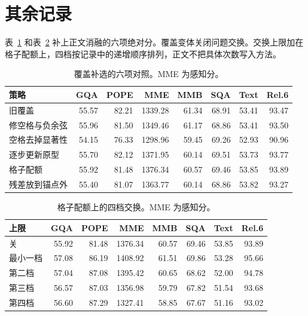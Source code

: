 \appendix
\section{其余记录}
\label{sec:appendix}

表~\ref{tab:coverfull} 和表~\ref{tab:swapfull} 补上正文消融的六项绝对分。覆盖变体关闭问题交换。交换上限加在格子配额上，四档按记录中的递增顺序排列，正文不把具体次数写入方法。

\begin{table}[h]
\centering
\scriptsize
\setlength{\tabcolsep}{2.6pt}
\caption{覆盖补选的六项对照。MME 为感知分。}
\label{tab:coverfull}
\begin{tabular}{@{}lrrrrrr r@{}}
\hline
策略 & GQA & POPE & MME & MMB & SQA & Text & Rel.6 \\
\hline
旧覆盖 & 55.57 & 82.21 & 1339.28 & 61.34 & 68.91 & 53.41 & 93.47 \\
修空格与负余弦 & 55.96 & 81.50 & 1349.46 & 61.17 & 68.86 & 53.41 & 93.50 \\
空格去掉显著性 & 54.15 & 76.33 & 1298.96 & 59.45 & 69.26 & 52.93 & 90.96 \\
逐步更新原型 & 55.70 & 82.12 & 1371.95 & 60.14 & 69.51 & 53.73 & 93.77 \\
格子配额 & 55.92 & 81.48 & 1376.34 & 60.57 & 69.46 & 53.85 & 93.89 \\
残差放到锚点外 & 55.40 & 81.07 & 1363.77 & 60.14 & 68.86 & 53.82 & 93.27 \\
\hline
\end{tabular}
\end{table}

\begin{table}[h]
\centering
\scriptsize
\setlength{\tabcolsep}{2.6pt}
\caption{格子配额上的四档交换。MME 为感知分。}
\label{tab:swapfull}
\begin{tabular}{@{}lrrrrrr r@{}}
\hline
上限 & GQA & POPE & MME & MMB & SQA & Text & Rel.6 \\
\hline
关 & 55.92 & 81.48 & 1376.34 & 60.57 & 69.46 & 53.85 & 93.89 \\
最小一档 & 57.08 & 86.19 & 1408.92 & 61.51 & 69.86 & 53.28 & 95.66 \\
第二档 & 57.04 & 87.08 & 1395.42 & 60.65 & 68.62 & 52.00 & 94.78 \\
第三档 & 56.57 & 87.03 & 1356.98 & 59.79 & 67.82 & 51.54 & 93.68 \\
第四档 & 56.60 & 87.29 & 1327.41 & 58.85 & 67.67 & 51.16 & 93.02 \\
\hline
\end{tabular}
\end{table}

